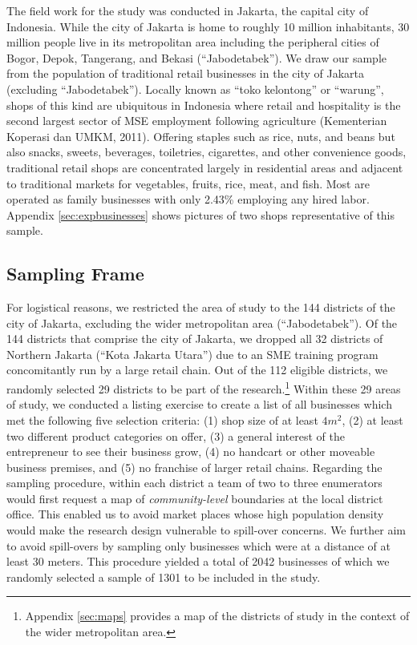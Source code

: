 \documentclass[11.5pt]{article}
\begin{document}
{The field work for the study was conducted in Jakarta, the capital city of Indonesia. While the city of Jakarta is home to roughly 10 million inhabitants, 30 million people live in its metropolitan area including the peripheral cities of Bogor, Depok, Tangerang, and Bekasi (``Jabodetabek''). We draw our sample from the population of traditional retail businesses in the city of Jakarta (excluding ``Jabodetabek''). Locally known as ``toko kelontong'' or ``warung'', shops of this kind are ubiquitous in Indonesia where retail and hospitality is the second largest sector of MSE employment following agriculture (Kementerian Koperasi dan UMKM, 2011). Offering staples such as rice, nuts, and beans but also snacks, sweets, beverages, toiletries, cigarettes, and other convenience goods, traditional retail shops are concentrated largely in residential areas and adjacent to traditional markets for vegetables, fruits, rice, meat, and fish. Most are operated as family businesses with only 2.43\% employing any hired labor. Appendix \ref{sec:expbusinesses} shows pictures of two shops representative of this sample.


\subsection{Sampling Frame}

For logistical reasons, we restricted the area of study to the 144 districts of the city of Jakarta, excluding the wider metropolitan area (``Jabodetabek''). Of the 144 districts that comprise the city of Jakarta, we dropped all 32 districts of Northern Jakarta (``Kota Jakarta Utara'') due to an SME training program concomitantly run by a large retail chain. Out of the 112 eligible districts, we randomly selected 29 districts to be part of the research.\footnote{Appendix \ref{sec:maps} provides a map of the districts of study in the context of the wider metropolitan area.} Within these 29 areas of study, we conducted a listing exercise to create a list of all businesses which met the following five selection criteria: (1) shop size of at least $4m^2$, (2) at least two different product categories on offer, (3) a general interest of the entrepreneur to see their business grow, (4) no handcart or other moveable business premises, and (5) no franchise of larger retail chains. Regarding the sampling procedure, within each district a team of two to three enumerators would first request a map of \textit{community-level} boundaries at the local district office. This enabled us to avoid market places whose high population density would make the research design vulnerable to spill-over concerns. We further aim to avoid spill-overs by sampling only businesses which were at a distance of at least 30 meters. This procedure yielded a total of 2042 businesses of which we randomly selected a sample of 1301 to be included in the study.

}
\end{document}
